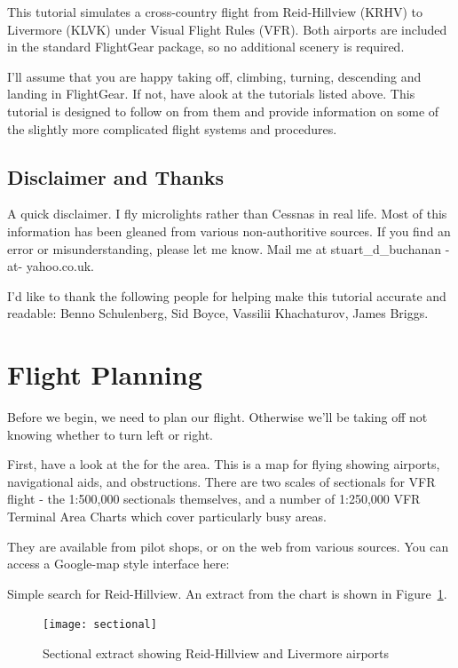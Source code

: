 This tutorial simulates a cross-country flight from Reid-Hillview (KRHV) to
Livermore (KLVK) under Visual Flight Rules (VFR). Both airports are
included in the standard FlightGear package, so no additional scenery is required.

I'll assume that you are happy taking off, climbing, turning, descending
and landing in FlightGear. If not, have alook at the tutorials listed above.
This tutorial is designed to follow on from them and provide information on
some of the slightly more complicated flight systems and procedures.

\subsection{Disclaimer and Thanks}

A quick disclaimer. I fly microlights rather than Cessnas in real life. Most of
this information has been gleaned from various non-authoritive sources. If you
find an error or misunderstanding, please let me know. Mail me at
stuart\_d\_buchanan -at- yahoo.co.uk.

I'd like to thank the following people for helping make this tutorial accurate
and readable: Benno Schulenberg, Sid Boyce, Vassilii Khachaturov, James Briggs.

\section{Flight Planning}

Before we begin, we need to plan our flight.
Otherwise we'll be taking off not knowing whether to turn left or right.

First, have a look at the  for the area. This is a map for
flying showing airports, navigational aids, and obstructions.
There are two scales of sectionals for VFR flight -
the 1:500,000 sectionals themselves, and a number of
1:250,000 VFR Terminal Area Charts which cover particularly busy areas.

They are available from pilot shops, or on the web from various sources.
You can access a Google-map style interface here:

\medskip
{}
\medskip

Simple search for Reid-Hillview. An extract from the chart is shown in Figure~\ref{sectional}.

\begin{figure}[!htp]
\centering
\texttt{[image: sectional]}
\caption{Sectional extract showing Reid-Hillview and Livermore airports\label{sectional}}
\end{figure}

